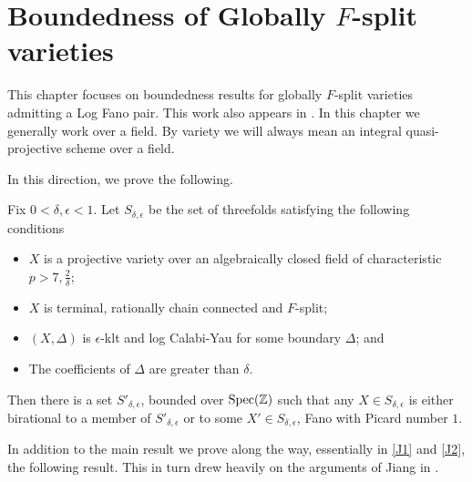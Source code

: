 	\chapter{Boundedness of Globally $F$-split varieties}\label{Boundedness}
	


This chapter focuses on boundedness results for globally $F$-split varieties admitting a Log Fano pair. This work also appears in \cite{stigant2020boundedness}. In this chapter we generally work over a field. By variety we will always mean an integral quasi-projective scheme over a field.

In this direction, we prove the following.

\begin{theorem}\label{Main_Bound}
	Fix $0 < \delta, \epsilon <1$. Let $S_{\delta,\epsilon}$ be the set of threefolds satisfying the following conditions
	\begin{itemize}
		\item $X$ is a projective variety over an algebraically closed field of characteristic $p >7, \frac{2}{\delta}$;
		\item $X$ is terminal, rationally chain connected and $F$-split;
		\item $(X,\Delta)$ is $\epsilon$-klt and log Calabi-Yau for some boundary $\Delta$; and
		\item The coefficients of $\Delta$ are greater than $\delta$.
	\end{itemize}
	
	Then there is a set $S'_{\delta,\epsilon}$, bounded over $\textup{Spec}(\mathbb{Z})$ such that any $X\in S_{\delta,\epsilon}$ is either birational to a member of $S'_{\delta,\epsilon}$ or to some $X'\in S_{\delta,\epsilon}$, Fano with Picard number $1$. 
\end{theorem}

In addition to the main result we prove along the way, essentially in \autoref{J1} and \autoref{J2}, the following result. This in turn drew heavily on the arguments of Jiang in \cite{jiang2014boundedness}.

